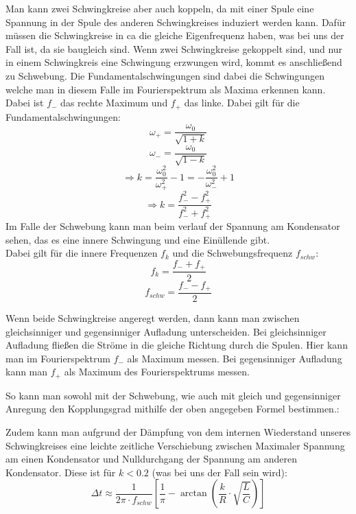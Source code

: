 \documentclass[twoside]{protokoll}
\begin{document}
Man kann zwei Schwingkreise aber auch koppeln, da mit einer Spule eine Spannung in der Spule des anderen Schwingkreises induziert werden kann.
Dafür müssen die Schwingkreise in ca die gleiche Eigenfrequenz haben, was bei uns der Fall ist, da sie baugleich sind.
Wenn zwei Schwingkreise gekoppelt sind, und nur in einem Schwingkreis eine Schwingung erzwungen wird, kommt es anschließend zu Schwebung.
Die Fundamentalschwingungen sind dabei die Schwingungen welche man in diesem Falle im Fourierspektrum als Maxima erkennen kann.
Dabei ist $f_-$ das rechte Maximum und $f_+$ das linke.
Dabei gilt für die Fundamentalschwingungen:
\begin{equation}
    \omega_+ = \frac{\omega_0}{\sqrt{1 + k}}
\end{equation}
\begin{equation}
    \omega_- = \frac{\omega_0}{\sqrt{1 - k}}
\end{equation}
\begin{equation}
    \Rightarrow k = \frac{\omega_0^2}{\omega_+^2} - 1 = - \frac{\omega_0^2}{\omega_-^2} + 1
\end{equation}
\begin{equation}
    \Rightarrow k = \frac{f_-^2 - f_+^2}{f_-^2 + f_+^2}
\end{equation}
Im Falle der Schwebung kann man beim verlauf der Spannung am Kondensator sehen, das es eine innere Schwingung und eine Einüllende gibt. \\
Dabei gilt für die innere Frequenzen $f_k$ und die Schwebungsfrequenz $f_{schw}$:
\begin{equation}
    f_k = \frac{f_- + f_+}{2}
\end{equation}
\begin{equation}
    f_{schw} = \frac{f_- - f_+}{2}
\end{equation}
    

Wenn beide Schwingkreise angeregt werden, dann kann man zwischen gleichsinniger und gegensinniger Aufladung unterscheiden.
Bei gleichsinniger Aufladung fließen die Ströme in die gleiche Richtung durch die Spulen.
Hier kann man im Fourierspektrum $f_-$ als Maximum messen.
Bei gegensinniger Aufladung kann man $f_+$ als Maximum des Fourierspektrums messen.

So kann man sowohl mit der Schwebung, wie auch mit gleich und gegensinniger Anregung den Kopplungsgrad mithilfe der oben angegeben Formel bestimmen.:

Zudem kann man aufgrund der Dämpfung von dem internen Wiederstand unseres Schwingkreises eine leichte zeitliche Verschiebung zwischen Maximaler Spannung am einen Kondensator und Nulldurchgang der Spannung am anderen Kondensator.
Diese ist für $ k < 0.2$ (was bei uns der Fall sein wird):
\begin{equation}
    \Delta t \approx \frac{1}{2 \pi \cdot f_{schw}} \left[ \frac{1}{\pi} - \arctan{\left( \frac{k}{R} \cdot \sqrt{\frac{L}{C}} \right)} \right]
\end{equation}
\end{document}
